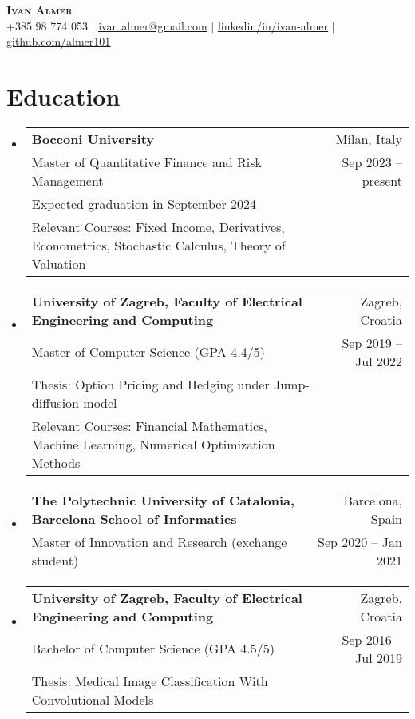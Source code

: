 \documentclass[letterpaper,11pt]{article}
\makeatletter
\newcommand{\resumeSubheading}[4]{
  \vspace{-2pt}\item
    \begin{tabular*}{0.97\textwidth}[t]{l@{\extracolsep{\fill}}r}
      \textbf{#1} & #2 \\
      \small #3 & \small #4 \\
    \end{tabular*}\vspace{-7pt}
}
\newcommand{\resumeSubheadingWithAdditional}[6]{
  \vspace{-2pt}\item
    \begin{tabular*}{0.97\textwidth}[t]{l@{\extracolsep{\fill}}r}
      \textbf{#1} & #2 \\
      \small #3 & \small #4 \\
      \small #5 \\
      \small #6
    \end{tabular*}\vspace{-7pt}
}
\newcommand{\resumeSubheadingWithAdditionall}[5]{
  \vspace{-2pt}\item
    \begin{tabular*}{0.97\textwidth}[t]{l@{\extracolsep{\fill}}r}
      \textbf{#1} & #2 \\
      \small #3 & \small #4 \\
      \small #5
    \end{tabular*}\vspace{-7pt}
}
\newcommand{\resumeSubHeadingListStart}{\begin{itemize}[leftmargin=0.15in, label={}]}
\newcommand{\resumeSubHeadingListEnd}{\end{itemize}}
\makeatother
\begin{document}

\begin{center}
    \textbf{\Huge \scshape Ivan Almer} \\ \vspace{2pt}
    \small +385 98 774 053 $|$ \href{mailto:ivan.almer@gmail.com}{\underline{ivan.almer@gmail.com}} $|$ 
    \href{https://linkedin.com/in/ivan-almer/}{\underline{linkedin/in/ivan-almer}} $|$
    \href{https://github.com/almer101}{\underline{github.com/almer101}}
    
\end{center}



\section{Education}
  \resumeSubHeadingListStart
    \resumeSubheadingWithAdditional
      {Bocconi University}{Milan, Italy}
      {Master of Quantitative Finance and Risk Management}{Sep 2023 -- present}{Expected graduation in September 2024}{Relevant Courses: Fixed Income, Derivatives, Econometrics, Stochastic Calculus, Theory of Valuation}
    \resumeSubheadingWithAdditional
      {University of Zagreb, Faculty of Electrical Engineering and Computing}{Zagreb, Croatia}
      {Master of Computer Science (GPA 4.4/5)}{Sep 2019 -- Jul 2022}{Thesis: Option Pricing and Hedging under Jump-diffusion model}
      {Relevant Courses: Financial Mathematics, Machine Learning, Numerical Optimization Methods}
    \resumeSubheading 
      {The Polytechnic University of Catalonia, Barcelona School of Informatics}{Barcelona, Spain}
      {Master of Innovation and Research (exchange student)}{Sep 2020 -- Jan 2021}
    \resumeSubheadingWithAdditionall
      {University of Zagreb, Faculty of Electrical Engineering and Computing}{Zagreb, Croatia}
      {Bachelor of Computer Science (GPA 4.5/5)}{Sep 2016 -- Jul 2019}{Thesis: Medical Image Classification With Convolutional Models}
  \resumeSubHeadingListEnd
\end{document}
